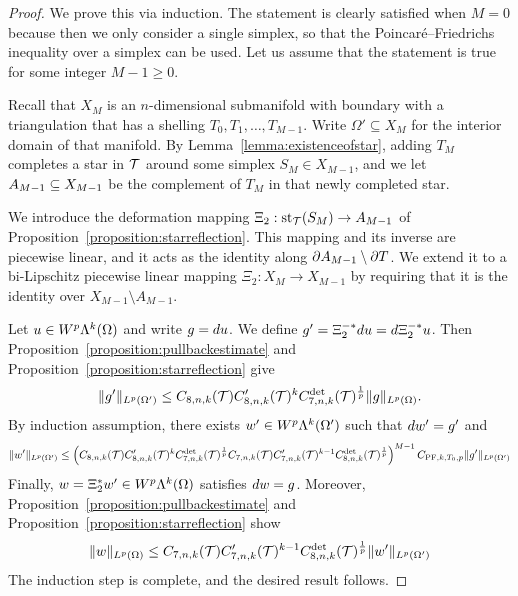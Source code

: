\documentclass[10pt,a4paper]{article}
\begin{document}
\begin{proof}
    We prove this via induction. 
    The statement is clearly satisfied when $M=0$ because then we only consider a single simplex,
    so that the Poincar\'e--Friedrichs inequality over a simplex can be used. 
    Let us assume that the statement is true for some integer $M-1 \geq 0$.
	
	
	Recall that $X_M$ is an $n$-dimensional submanifold with boundary with a triangulation that has a shelling $T_0, T_1, \dots, T_{M-1}$. 
	Write $\Omega' \subseteq X_{M}$ for the interior domain of that manifold. 
	By Lemma~\ref{lemma:existenceofstar}, adding $T_{M}$ completes a star in ${\mathcal T}$ around some simplex $S_{M} \in X_{M-1}$, 
	and we let $A_{M-1} \subseteq X_{M-1}$ be the complement of $T_{M}$ in that newly completed star. 
	
	We introduce the deformation mapping $\Xi_{2} : \operatorname{st}_{{\mathcal T}}(S_M) \rightarrow A_{M-1}$ of Proposition~\ref{proposition:starreflection}. 
	This mapping and its inverse are piecewise linear, and it acts as the identity along $\partial A_{M-1} \setminus \partial T$.
    We extend it to a bi-Lipschitz piecewise linear mapping $\Xi_{2} : X_{M} \rightarrow X_{M-1}$ by requiring that it is the identity over $X_{M-1} \setminus A_{M-1}$.
	
	Let $u \in W^{p}\Lambda^{k}(\Omega)$ and write $g = d u$. We define $g' = \Xi_{2}^{-\ast} d u = d \Xi_{2}^{-\ast} u$. 
    Then Proposition~\ref{proposition:pullbackestimate} and Proposition~\ref{proposition:starreflection} give  
    \begin{align*}
        \| g' \|_{L^{p}(\Omega')}  
        \leq 
        C_{8,n,k}({\mathcal T})
        C'_{8,n,k}({\mathcal T})^{k} 
        C^{\det}_{7,n,k}({\mathcal T})^{\frac 1 p} 
        \| g \|_{L^{p}(\Omega)}  
        .
    \end{align*}
    By induction assumption, there exists $w' \in W^{p}\Lambda^{k}(\Omega')$ such that $d w' = g'$ and 
    \begin{align*}
        \| w' \|_{L^{p}(\Omega')} 
        \leq 
        \left( 
        C_{8,n,k}({\mathcal T})
        C'_{8,n,k}({\mathcal T})^{k} 
        C^{\det}_{7,n,k}({\mathcal T})^{\frac 1 p} 
        C_{7,n,k}({\mathcal T})
        C'_{7,n,k}({\mathcal T})^{k-1} 
        C^{\det}_{8,n,k}({\mathcal T})^{\frac 1 p} 
        \right)^{M-1}
        C_{{{\rm PF}},k,T_{0},p}
        \| g' \|_{L^{p}(\Omega')}  
    \end{align*}
    Finally, $w = \Xi_{2}^{\ast} w' \in W^{p}\Lambda^{k}(\Omega)$ satisfies $d w = g$.
    Moreover, Proposition~\ref{proposition:pullbackestimate} and Proposition~\ref{proposition:starreflection} show 
    \begin{align*}
        \| w \|_{L^{p}(\Omega)}  
        \leq 
        C_{7,n,k}({\mathcal T})
        C'_{7,n,k}({\mathcal T})^{k-1} 
        C^{\det}_{8,n,k}({\mathcal T})^{\frac 1 p} 
        \| w' \|_{L^{p}(\Omega')} 
    \end{align*}
    The induction step is complete, and the desired result follows. 
\end{proof}
\end{document}
